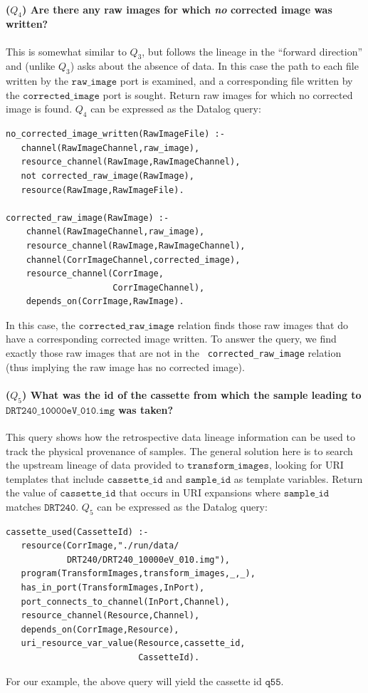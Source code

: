 \documentclass[nocopyrightspace]{sigplanconf}
\newcommand{\code}[1]{\ensuremath{\mathtt{#1}}}
\begin{document}
\paragraph{($Q_4$)
  Are there any raw images for which \emph{no} corrected image was written?}
This is somewhat similar to $Q_ 3$, but follows the lineage in the
``forward direction'' and (unlike $Q_3$) asks about the absence of %
data.  In this case the path to each file written by the
\code{raw\_image} port is examined, and a corresponding file written
by the \code{corrected\_image} port is sought.  Return raw images for
which no corrected image is found. $Q_4$ can be expressed as the Datalog query:

\begin{scriptsize}
\begin{verbatim}
no_corrected_image_written(RawImageFile) :-
   channel(RawImageChannel,raw_image),
   resource_channel(RawImage,RawImageChannel),
   not corrected_raw_image(RawImage),
   resource(RawImage,RawImageFile).

corrected_raw_image(RawImage) :-
    channel(RawImageChannel,raw_image),
    resource_channel(RawImage,RawImageChannel),
    channel(CorrImageChannel,corrected_image),
    resource_channel(CorrImage,
                     CorrImageChannel),
    depends_on(CorrImage,RawImage).
\end{verbatim}
\end{scriptsize}
In this case, the \code{corrected\_raw\_image} relation finds those raw
images that do have a corresponding corrected image written. To answer
the query, we find exactly those raw images that are not in the  {\tt
  corrected\_raw\_image} relation (thus implying the raw image has no
corrected image).

\paragraph{($Q_5$) What was the id of the cassette from which the
  sample leading to \code{DRT240\_10000eV\_010.img} was taken?} This
query shows how the retrospective data lineage information can be used
to track the physical provenance of samples.  The general solution
here is to search the upstream lineage of data provided to
\code{transform\_images}, looking for URI templates that include
\code{cassette\_id} and \code{sample\_id} as template
variables. Return the value of \code{cassette\_id} that occurs in URI
expansions where \code{sample\_id} matches \code{DRT240}. $Q_5$ can be
expressed as the Datalog query:
\begin{scriptsize}
\begin{verbatim}
cassette_used(CassetteId) :-
   resource(CorrImage,"./run/data/
            DRT240/DRT240_10000eV_010.img"),
   program(TransformImages,transform_images,_,_),
   has_in_port(TransformImages,InPort), 
   port_connects_to_channel(InPort,Channel), 
   resource_channel(Resource,Channel), 
   depends_on(CorrImage,Resource), 
   uri_resource_var_value(Resource,cassette_id,
                          CassetteId).
\end{verbatim}
\end{scriptsize}
For our example, the above query will yield the cassette id  \code{q55}.
\end{document}
